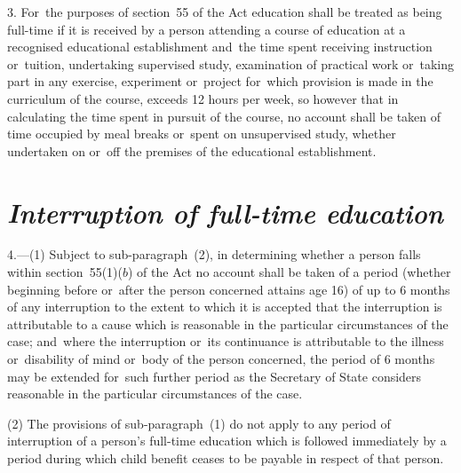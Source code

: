 \documentclass[12pt,a4paper]{article}
\begin{document}
3.  For~the purposes of section~55 of the Act education shall be treated as being full-time if it is received by a person attending a course of education at a recognised educational establishment and~the time spent receiving instruction or~tuition, undertaking supervised study, examination of practical work or~taking part in any exercise, experiment or~project for~which provision is made in the curriculum of the course, exceeds 12 hours per week, so however that in calculating the time spent in pursuit of the course, no account shall be taken of time occupied by meal breaks or~spent on unsupervised study, whether undertaken on or~off the premises of the educational establishment.

\section*{\itshape Interruption of full-time education}

4.---(1)  Subject to sub-paragraph~(2), in determining whether a person falls within section~55(1)($b$)  of the Act no account shall be taken of a period (whether beginning before or~after the person concerned attains age 16) of up to 6 months of any interruption to the extent to which it is accepted that the interruption is attributable to a cause which is reasonable in the particular circumstances of the case; and~where the interruption or~its continuance is attributable to the illness or~disability of mind or~body of the person concerned, the period of 6 months may be extended for~such further period as the Secretary of State considers reasonable in the particular circumstances of the case.

%

(2) The provisions of sub-paragraph~(1) do not apply to any period of interruption of a person’s full-time education which is followed immediately by a period during which child benefit ceases to be payable in respect of that person.
\end{document}
